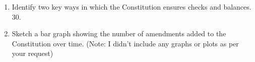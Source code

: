 \documentclass{article}
\begin{document}
\begin{enumerate}
\item Identify two key ways in which the Constitution ensures checks and balances. 30. \item Sketch a bar graph showing the number of amendments added to the Constitution over time. (Note: I didn't include any graphs or plots as per your request) \vspace{2cm}
\end{enumerate}
\end{document}
